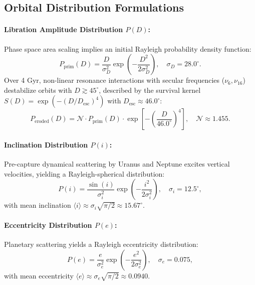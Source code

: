 \documentclass[11pt,a4paper]{article}
\begin{document}
\subsection{Orbital Distribution Formulations}
\paragraph{Libration Amplitude Distribution $P(D)$:} Phase space area scaling implies an initial Rayleigh probability density function:
\begin{equation}
P_{\text{prim}}(D) = \frac{D}{\sigma_D^2} \exp\left(-\frac{D^2}{2\sigma_D^2}\right), \quad \sigma_D = 28.0^\circ.
\end{equation}
Over 4 Gyr, non-linear resonance interactions with secular frequencies ($\nu_6, \nu_{16}$) destabilize orbits with $D \gtrsim 45^\circ$, described by the survival kernel $S(D) = \exp\left(-(D/D_{\text{esc}})^4\right)$ with $D_{\text{esc}} \approx 46.0^\circ$:
\begin{equation}
P_{\text{eroded}}(D) = \mathcal{N} \cdot P_{\text{prim}}(D) \cdot \exp\left[-\left(\frac{D}{46.0^\circ}\right)^4\right], \quad \mathcal{N} \approx 1.455.
\end{equation}

\paragraph{Inclination Distribution $P(i)$:} Pre-capture dynamical scattering by Uranus and Neptune excites vertical velocities, yielding a Rayleigh-spherical distribution:
\begin{equation}
P(i) = \frac{\sin(i)}{\sigma_i^2} \exp\left(-\frac{i^2}{2\sigma_i^2}\right), \quad \sigma_i = 12.5^\circ,
\end{equation}
with mean inclination $\langle i \rangle \approx \sigma_i \sqrt{\pi/2} \approx 15.67^\circ$.

\paragraph{Eccentricity Distribution $P(e)$:} Planetary scattering yields a Rayleigh eccentricity distribution:
\begin{equation}
P(e) = \frac{e}{\sigma_e^2} \exp\left(-\frac{e^2}{2\sigma_e^2}\right), \quad \sigma_e = 0.075,
\end{equation}
with mean eccentricity $\langle e \rangle \approx \sigma_e \sqrt{\pi/2} \approx 0.0940$.
\end{document}
